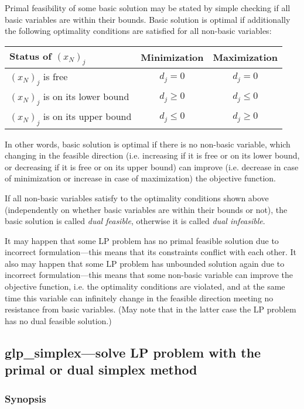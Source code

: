 Primal feasibility of some basic solution may be stated by simple
checking if all basic variables are within their bounds. Basic solution
is optimal if additionally the following optimality conditions are
satisfied for all non-basic variables:
\begin{center}
\begin{tabular}{lcc}
Status of $(x_N)_j$ & Minimization & Maximization \\
\hline
$(x_N)_j$ is free & $d_j = 0$ & $d_j = 0$ \\
$(x_N)_j$ is on its lower bound & $d_j \geq 0$ & $d_j \leq 0$ \\
$(x_N)_j$ is on its upper bound & $d_j \leq 0$ & $d_j \geq 0$ \\
\end{tabular}
\end{center}
In other words, basic solution is optimal if there is no non-basic
variable, which changing in the feasible direction (i.e. increasing if
it is free or on its lower bound, or decreasing if it is free or on its
upper bound) can improve (i.e. decrease in case of minimization or
increase in case of maximization) the objective function.

If all non-basic variables satisfy to the optimality conditions shown
above (independently on whether basic variables are within their bounds
or not), the basic solution is called {\it dual feasible}, otherwise it
is called {\it dual infeasible}.

It may happen that some LP problem has no primal feasible solution due
to incorrect formulation---this means that its constraints conflict
with each other. It also may happen that some LP problem has unbounded
solution again due to incorrect formulation---this means that some
non-basic variable can improve the objective function, i.e. the
optimality conditions are violated, and at the same time this variable
can infinitely change in the feasible direction meeting no resistance
from basic variables. (May note that in the latter case the LP problem
has no dual feasible solution.)


\subsection{glp\_simplex---solve LP problem with the primal or dual
simplex method}

\subsubsection*{Synopsis}

